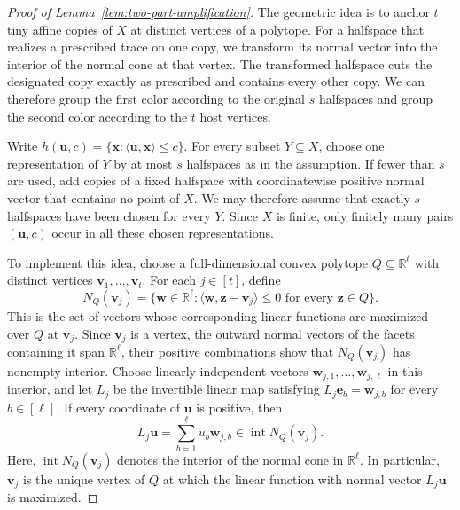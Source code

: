 \documentclass[10pt,a4paper]{amsart}
\newcommand{\R}{\mathbb{R}}
\begin{document}
\begin{proof}[Proof of Lemma~\ref{lem:two-part-amplification}]
The geometric idea is to anchor \(t\) tiny affine copies of \(X\) at distinct vertices of a polytope. For a halfspace that realizes a prescribed trace on one copy, we transform its normal vector into the interior of the normal cone at that vertex. The transformed halfspace cuts the designated copy exactly as prescribed and contains every other copy. We can therefore group the first color according to the original \(s\) halfspaces and group the second color according to the \(t\) host vertices.

Write \(h(\boldsymbol{u},c)=\{\boldsymbol{x}:\langle\boldsymbol{u},\boldsymbol{x}\rangle\le c\}\). For every subset \(Y\subseteq X\), choose one representation of \(Y\) by at most \(s\) halfspaces as in the assumption. If fewer than \(s\) are used, add copies of a fixed halfspace with coordinatewise positive normal vector that contains no point of \(X\). We may therefore assume that exactly \(s\) halfspaces have been chosen for every \(Y\). Since \(X\) is finite, only finitely many pairs \((\boldsymbol{u},c)\) occur in all these chosen representations.

To implement this idea, choose a full-dimensional convex polytope \(Q\subseteq\R^{\ell}\) with distinct vertices \(\boldsymbol{v}_{1},\ldots,\boldsymbol{v}_{t}\). For each \(j\in[t]\), define
\[
N_{Q}(\boldsymbol{v}_{j})=\{\boldsymbol{w}\in\R^{\ell}:\langle\boldsymbol{w},\boldsymbol{z}-\boldsymbol{v}_{j}\rangle\le0\text{ for every }\boldsymbol{z}\in Q\}.
\]
This is the set of vectors whose corresponding linear functions are maximized over \(Q\) at \(\boldsymbol{v}_{j}\). Since \(\boldsymbol{v}_{j}\) is a vertex, the outward normal vectors of the facets containing it span \(\R^{\ell}\), their positive combinations show that \(N_{Q}(\boldsymbol{v}_{j})\) has nonempty interior. Choose linearly independent vectors \(\boldsymbol{w}_{j,1},\ldots,\boldsymbol{w}_{j,\ell}\) in this interior, and let \(L_{j}\) be the invertible linear map satisfying \(L_{j}\boldsymbol{e}_{b}=\boldsymbol{w}_{j,b}\) for every \(b\in[\ell]\). If every coordinate of \(\boldsymbol{u}\) is positive, then
\[
L_{j}\boldsymbol{u}=\sum_{b=1}^{\ell}u_{b}\boldsymbol{w}_{j,b}\in\operatorname{int}N_{Q}(\boldsymbol{v}_{j}).
\]
Here, \(\operatorname{int}N_{Q}(\boldsymbol{v}_{j})\) denotes the
interior of the normal cone in \(\R^{\ell}\). In particular, \(\boldsymbol{v}_{j}\) is the unique vertex of \(Q\) at which the linear function with normal vector \(L_{j}\boldsymbol{u}\) is maximized.


\end{proof}
\end{document}
